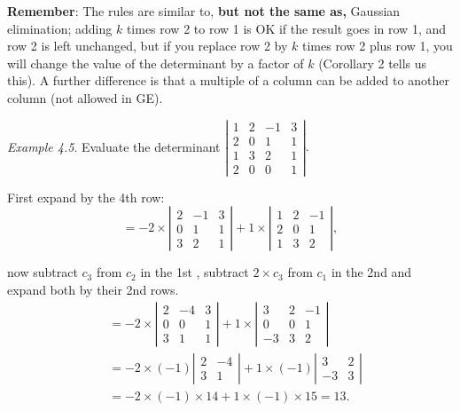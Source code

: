 \documentclass[
  letterpaper,
  DIV=11,
  numbers=noendperiod]{scrartcl}
\theoremstyle{remark}
\begin{document}
\textbf{Remember}: The rules are similar to, \textbf{but not the same
as,} Gaussian elimination; adding \(k\) times row 2 to row 1 is OK if
the result goes in row 1, and row 2 is left unchanged, but if you
replace row 2 by \(k\) times row 2 plus row 1, you will change the value
of the determinant by a factor of \(k\) (Corollary 2 tells us this). A
further difference is that a multiple of a column can be added to
another column (not allowed in GE).

\emph{Example 4.5}. Evaluate the determinant \(\left|
\begin{array}{cccc}
1 & 2 & -1 & 3 \\
2 & 0 & 1 & 1 \\
1 & 3 & 2 & 1 \\
2 & 0 & 0 & 1
\end{array}
\right| .\)

First expand by the 4th row: \[= -2\times \left| 
\begin{array}{ccc}
2 & -1 & 3 \\ 
0 & 1 & 1 \\ 
3 & 2 & 1
\end{array}
\right| +1\times \left| 
\begin{array}{ccc}
1 & 2 & -1 \\ 
2 & 0 & 1 \\ 
1 & 3 & 2
\end{array}
\right| ,\]

now subtract \(c_{3}\) from \(c_{2}\) in the 1st , subtract \(2\times
c_{3}\) from \(c_{1}\) in the 2nd and expand both by their 2nd rows.
\[\begin{aligned}
&=-2\times \left| 
\begin{array}{ccc}
2 & -4 & 3 \\ 
0 & 0 & 1 \\ 
3 & 1 & 1
\end{array}
\right| +1\times \left| 
\begin{array}{ccc}
3 & 2 & -1 \\ 
0 & 0 & 1 \\ 
-3 & 3 & 2
\end{array}
\right| \\
&=-2\times \left( -1\right) \left| 
\begin{array}{cc}
2 & -4 \\ 
3 & 1
\end{array}
\right| +1\times \left( -1\right) \left| 
\begin{array}{cc}
3 & 2 \\ 
-3 & 3
\end{array}
\right| \\
&=-2\times \left( -1\right) \times 14+1\times \left( -1\right) \times 15=13.
\end{aligned}\]
\end{document}
